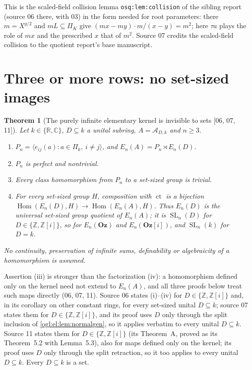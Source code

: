 \documentclass[11pt,oneside]{article}
\numberwithin{equation}{section}
\newtheorem{theorem}{Theorem}[section]
\theoremstyle{definition}
\theoremstyle{remark}
\newcommand{\Oz}{\mathbf{Oz}}
\newcommand{\GOz}{\mathbf{Oz}[i]}
\newcommand{\Z}{\mathbb Z}
\newcommand{\R}{\mathbb R}
\newcommand{\C}{\mathbb C}
\newcommand{\A}{\mathcal A}
\newcommand{\ct}{\operatorname{ct}}
\newcommand{\SL}{\operatorname{SL}}
\newcommand{\Hom}{\operatorname{Hom}}
\newcommand{\src}[1]{\textup{\textsf{\small[#1]}}}
\newcommand{\replabel}[1]{\nolinkurl{#1}}
\begin{document}
This is the scaled-field collision lemma \replabel{osq:lem:collision} of the
sibling report (source 06 there, with 03) in the form needed for root
parameters: there $m=X^{g/2}$ and $mL\subseteq\Pi_K$ give
$(mx-my)\cdot m/(x-y)=m^2$; here $\tau a$ plays the role of $mx$ and the
prescribed $x$ that of $m^2$. Source 07 credits the scaled-field collision to
the quotient report's base manuscript.

\section{Three or more rows: no set-sized images}\label{ogl:el:sec:high}

\begin{theorem}[The purely infinite elementary kernel is invisible to sets \src{06, 07, 11}]\label{ogl:el:thm:invisible}
Let $k\in\{\R,\C\}$, $D\subseteq k$ a unital subring, $A=\A_{D,k}$ and $n\ge3$.
\begin{enumerate}
\item $P_n=\langle e_{ij}(a):a\in\Pi_k,\ i\ne j\rangle$, and
$E_n(A)=P_n\rtimes E_n(D)$.
\item $P_n$ is perfect and nontrivial.
\item Every class homomorphism from $P_n$ to a set-sized group is trivial.
\item For every set-sized group $H$, composition with $\ct$ is a bijection
$\Hom(E_n(D),H)\to\Hom(E_n(A),H)$. Thus $E_n(D)$ is the universal set-sized
group quotient of $E_n(A)$; it is $\SL_n(D)$ for $D\in\{\Z,\Z[i]\}$, so for
$E_n(\Oz)$ and $E_n(\GOz)$, and $\SL_n(k)$ for $D=k$.
\end{enumerate}
No continuity, preservation of infinite sums, definability or algebraicity of a
homomorphism is assumed.
\end{theorem}

Assertion (iii) is stronger than the factorization (iv): a homomorphism defined
only on the kernel need not extend to $E_n(A)$, and all three proofs below treat
such maps directly (06, 07, 11). Source 06 states (i)--(iv) for $D\in\{\Z,\Z[i]\}$ and, in its
corollary on other constant rings, for every set-sized unital $D\subseteq k$;
source 07 states them for $D\in\{\Z,\Z[i]\}$, and its proof uses $D$ only
through the split inclusion of \cref{ogl:el:lem:normalgen}, so it applies
verbatim to every unital $D\subseteq k$. Source 11 states them for
$D\in\{\Z,\Z[i]\}$ (its Theorem~A, proved as its Theorem~5.2 with Lemma~5.3),
also for maps defined only on the kernel; its proof uses $D$ only through the
split retraction, so it too applies to every unital $D\subseteq k$. Every
$D\subseteq k$ is a set.
\end{document}
